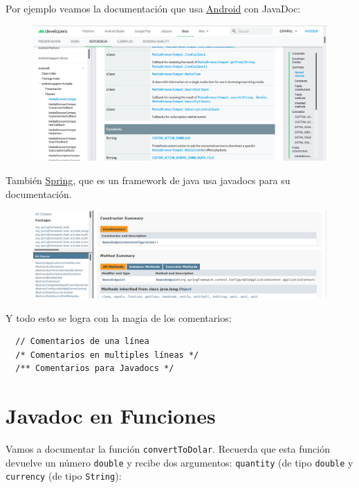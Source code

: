 \documentclass{article}
\begin{document}
Por ejemplo veamos la documentación que usa
\href{https://developer.android.com/reference/android/support/v4/media/MediaBrowserCompat}{Android}
con JavaDoc:

\begin{figure}[h!]
  \centering
  \includegraphics[scale=0.5]{./Pictures/050_javadocs_android.png}
\end{figure}

También \href{https://docs.spring.io/spring-boot/docs/2.2.0.M6/api/}{Spring},
que es un framework de java usa javadocs para su documentación.

\begin{figure}[h!]
  \centering
  \includegraphics[scale=0.5]{./Pictures/051_javadocs_spring.png}
\end{figure}

Y todo esto se logra con la magia de los comentarios:
\begin{verbatim}
  // Comentarios de una línea
  /* Comentarios en multiples líneas */
  /** Comentarios para Javadocs */
\end{verbatim}

\section{Javadoc en Funciones }%
Vamos a documentar la función \texttt{convertToDolar}. Recuerda que esta
función devuelve un número \texttt{double} y recibe dos argumentos:
\texttt{quantity} (de tipo \texttt{double} y \texttt{currency} (de tipo
\texttt{String}):
\end{document}
